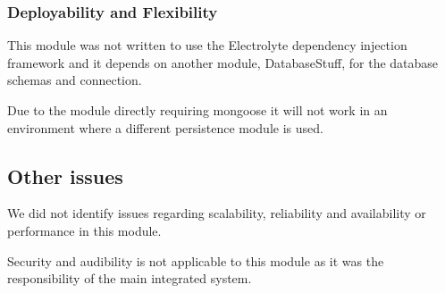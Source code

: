 \subsubsection{Deployability and Flexibility}
This module was not written to use the Electrolyte dependency injection framework and it depends on another module, DatabaseStuff, for the database schemas and connection.

Due to the module directly requiring mongoose it will not work in an environment where a different persistence module is used. 

\subsection{Other issues}
We did not identify issues regarding scalability, reliability and availability or performance in this module.

Security and audibility is not applicable to this module as it was the responsibility of the main integrated system.
